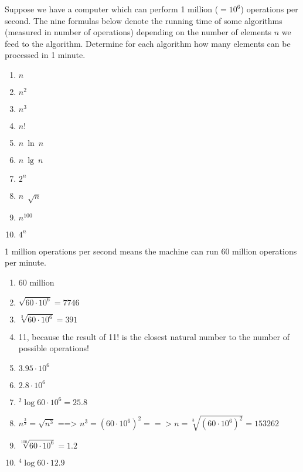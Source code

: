 \documentclass{article}
\begin{document}
Suppose we have a computer which can perform 1 million ($= 10^6$) operations per second. The nine formulas below denote the running time of some algorithms (measured in number of operations) depending on the number of elements $n$ we feed to the algorithm. Determine for each algorithm how many elements can be processed in 1 minute.
\begin{multicols}{5}
\begin{enumerate}
	\item $n$
    \item $n^2$
    \item $n^3$
    \item $n!$
    \item $n\ \ln\ n$
    \item $n\ \lg\ n$
    \item $2^n$
    \item $n\ \sqrt[]{n}$
    \item $n^{100}$
    \item $4^n$
\end{enumerate}
\end{multicols}

1 million operations per second means the machine can run 60 million operations per minute.
\begin{enumerate}
\section*{Solutions}
    \item 60 million
    \item $\sqrt{60 \cdot 10^6} = 7746$
    \item $\sqrt[3]{60 \cdot 10^6} = 391$
    \item 11, because the result of 11! is the closest natural number to the number of possible operations!
    \item $3.95 \cdot 10^6$
    \item $2.8 \cdot 10^6$
    \item $^2 \log 60 \cdot 10^6 = 25.8 $
    \item $n^\frac{3}{2} = \sqrt{n^3} $ ==> $n^3 = (60 \cdot 10^6)^2 ==> n = \sqrt[3]{(60 \cdot 10^6)^2} = 153262$
    \item $\sqrt[100]{60 \cdot 10^6} = 1.2$
    \item $^4 \log 60 \cdot 12.9$
\end{enumerate}
\end{document}
